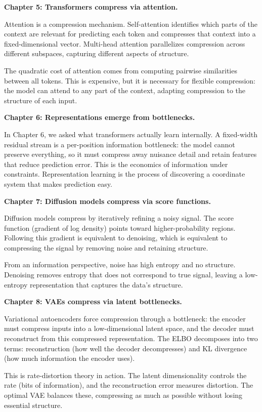 \textbf{Chapter 5: Transformers compress via attention.}

Attention is a compression mechanism. Self-attention identifies which parts of the context are relevant for predicting each token and compresses that context into a fixed-dimensional vector. Multi-head attention parallelizes compression across different subspaces, capturing different aspects of structure.

The quadratic cost of attention comes from computing pairwise similarities between all tokens. This is expensive, but it is necessary for flexible compression: the model can attend to any part of the context, adapting compression to the structure of each input.

\textbf{Chapter 6: Representations emerge from bottlenecks.}

In Chapter 6, we asked what transformers actually learn internally. A fixed-width residual stream is a per-position information bottleneck: the model cannot preserve everything, so it must compress away nuisance detail and retain features that reduce prediction error. This is the economics of information under constraints. Representation learning is the process of discovering a coordinate system that makes prediction easy.

\textbf{Chapter 7: Diffusion models compress via score functions.}

Diffusion models compress by iteratively refining a noisy signal. The score function (gradient of log density) points toward higher-probability regions. Following this gradient is equivalent to denoising, which is equivalent to compressing the signal by removing noise and retaining structure.

From an information perspective, noise has high entropy and no structure. Denoising removes entropy that does not correspond to true signal, leaving a low-entropy representation that captures the data's structure.

\textbf{Chapter 8: VAEs compress via latent bottlenecks.}

Variational autoencoders force compression through a bottleneck: the encoder must compress inputs into a low-dimensional latent space, and the decoder must reconstruct from this compressed representation. The ELBO decomposes into two terms: reconstruction (how well the decoder decompresses) and KL divergence (how much information the encoder uses).

This is rate-distortion theory in action. The latent dimensionality controls the rate (bits of information), and the reconstruction error measures distortion. The optimal VAE balances these, compressing as much as possible without losing essential structure.

